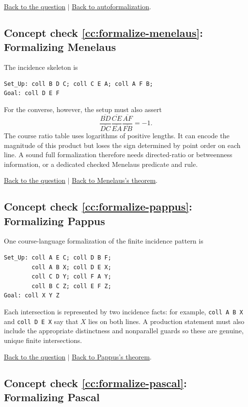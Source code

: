 \documentclass[reqno]{amsart}
\DeclareMathOperator{\1}{\textbf{1}}
\begin{document}
\noindent\hyperlink{ccq:autoformalization}{Back to the question}
$\mid$
\hyperref[sec: Autoformalization]{Back to autoformalization}.

\hypertarget{cca:formalize-menelaus}{}
\subsection*{Concept check \ref{cc:formalize-menelaus}: Formalizing Menelaus}

The incidence skeleton is
\begin{lstlisting}
Set_Up: coll B D C; coll C E A; coll A F B;
Goal: coll D E F
\end{lstlisting}
For the converse, however, the setup must also assert
\[
 \frac{\overline{BD}}{\overline{DC}}
 \frac{\overline{CE}}{\overline{EA}}
 \frac{\overline{AF}}{\overline{FB}}=-1.
\]
The course ratio table uses logarithms of positive lengths. It can encode the
magnitude of this product but loses the sign determined by point order on each
line. A sound full formalization therefore needs directed-ratio or betweenness
information, or a dedicated checked Menelaus predicate and rule.

\noindent\hyperlink{ccq:formalize-menelaus}{Back to the question}
$\mid$
\hyperref[sec: Menelaus]{Back to Menelaus's theorem}.

\hypertarget{cca:formalize-pappus}{}
\subsection*{Concept check \ref{cc:formalize-pappus}: Formalizing Pappus}

One course-language formalization of the finite incidence pattern is
\begin{lstlisting}
Set_Up: coll A E C; coll D B F;
        coll A B X; coll D E X;
        coll C D Y; coll F A Y;
        coll B C Z; coll E F Z;
Goal: coll X Y Z
\end{lstlisting}
Each intersection is represented by two incidence facts: for example,
\verb|coll A B X| and \verb|coll D E X| say that $X$ lies on both lines.
A production statement must also include the appropriate distinctness and
nonparallel guards so these are genuine, unique finite intersections.

\noindent\hyperlink{ccq:formalize-pappus}{Back to the question}
$\mid$
\hyperref[sec: Pappus]{Back to Pappus's theorem}.

\hypertarget{cca:formalize-pascal}{}
\subsection*{Concept check \ref{cc:formalize-pascal}: Formalizing Pascal}
\end{document}
